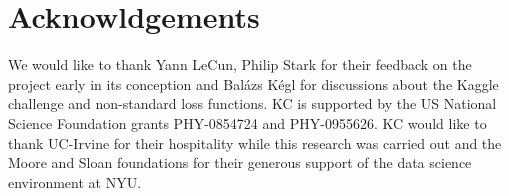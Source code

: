 \documentclass[11pt, oneside]{article}   	%
\begin{document}




\section*{Acknowldgements}
We would like to thank Yann LeCun, Philip Stark for their feedback on the
project early in its conception and Bal\'azs K\'egl for discussions about the Kaggle challenge and 
non-standard loss functions.
KC is supported by the US National Science Foundation grants PHY-0854724 and PHY-0955626. 
KC would like to thank UC-Irvine for their hospitality while this research was carried out and the 
Moore and Sloan foundations for their generous support of the data science environment at NYU.
\end{document}
